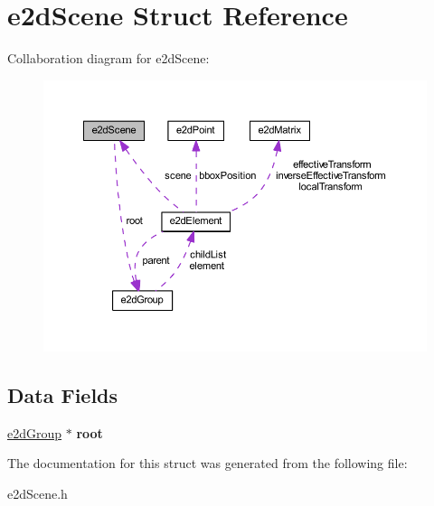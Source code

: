 \hypertarget{structe2dScene}{\section{e2d\-Scene Struct Reference}
\label{structe2dScene}
}


Collaboration diagram for e2d\-Scene\-:
\nopagebreak
\begin{figure}[H]
\begin{center}
\leavevmode
\includegraphics[width=350pt]{structe2dScene__coll__graph}
\end{center}
\end{figure}
\subsection*{Data Fields}
\begin{DoxyCompactItemize}
\item 
\hypertarget{structe2dScene_aa5444ac46bf18449921a4094bcadde1c}{\hyperlink{structe2dGroup}{e2d\-Group} $\ast$ {\bfseries root}}\label{structe2dScene_aa5444ac46bf18449921a4094bcadde1c}

\end{DoxyCompactItemize}


The documentation for this struct was generated from the following file\-:\begin{DoxyCompactItemize}
\item 
e2d\-Scene.\-h\end{DoxyCompactItemize}
